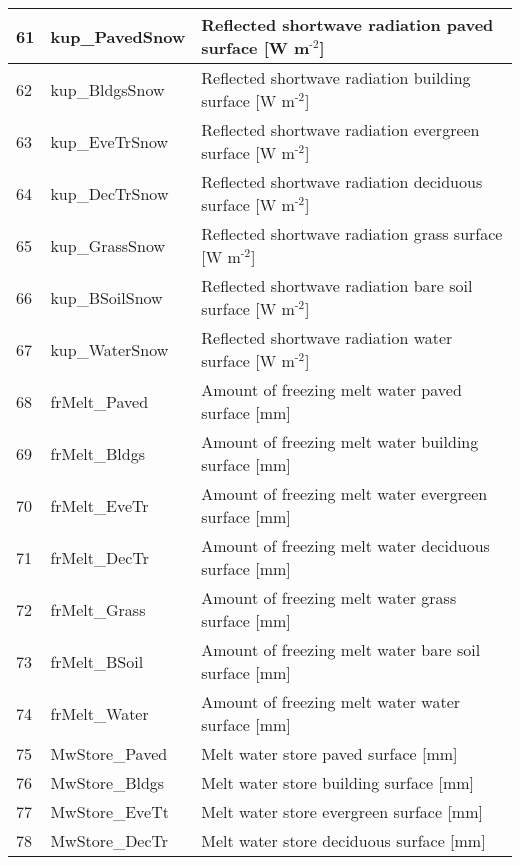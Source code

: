 \documentclass[letterpaper,10pt,english]{sphinxmanual}
\begin{document}
\begin{savenotes}
\begin{longtable}{|l|l|l|}
\\
\hline
61
&
kup\_PavedSnow
&
Reflected shortwave radiation \textendash{} paved surface {[}W m$^{\text{-2}}${]}
\\
\hline
62
&
kup\_BldgsSnow
&
Reflected shortwave radiation \textendash{} building surface {[}W m$^{\text{-2}}${]}
\\
\hline
63
&
kup\_EveTrSnow
&
Reflected shortwave radiation \textendash{} evergreen surface {[}W m$^{\text{-2}}${]}
\\
\hline
64
&
kup\_DecTrSnow
&
Reflected shortwave radiation \textendash{} deciduous surface {[}W m$^{\text{-2}}${]}
\\
\hline
65
&
kup\_GrassSnow
&
Reflected shortwave radiation \textendash{} grass surface {[}W m$^{\text{-2}}${]}
\\
\hline
66
&
kup\_BSoilSnow
&
Reflected shortwave radiation \textendash{} bare soil surface {[}W m$^{\text{-2}}${]}
\\
\hline
67
&
kup\_WaterSnow
&
Reflected shortwave radiation \textendash{} water surface {[}W m$^{\text{-2}}${]}
\\
\hline
68
&
frMelt\_Paved
&
Amount of freezing melt water \textendash{} paved surface {[}mm{]}
\\
\hline
69
&
frMelt\_Bldgs
&
Amount of freezing melt water \textendash{} building surface {[}mm{]}
\\
\hline
70
&
frMelt\_EveTr
&
Amount of freezing melt water \textendash{} evergreen surface {[}mm{]}
\\
\hline
71
&
frMelt\_DecTr
&
Amount of freezing melt water \textendash{} deciduous surface {[}mm{]}
\\
\hline
72
&
frMelt\_Grass
&
Amount of freezing melt water \textendash{} grass surface {[}mm{]}
\\
\hline
73
&
frMelt\_BSoil
&
Amount of freezing melt water \textendash{} bare soil surface {[}mm{]}
\\
\hline
74
&
frMelt\_Water
&
Amount of freezing melt water \textendash{} water surface {[}mm{]}
\\
\hline
75
&
MwStore\_Paved
&
Melt water store \textendash{} paved surface {[}mm{]}
\\
\hline
76
&
MwStore\_Bldgs
&
Melt water store \textendash{} building surface {[}mm{]}
\\
\hline
77
&
MwStore\_EveTt
&
Melt water store \textendash{} evergreen surface {[}mm{]}
\\
\hline
78
&
MwStore\_DecTr
&
Melt water store \textendash{} deciduous surface {[}mm{]}
\\

\end{longtable}
\end{savenotes}
\end{document}
